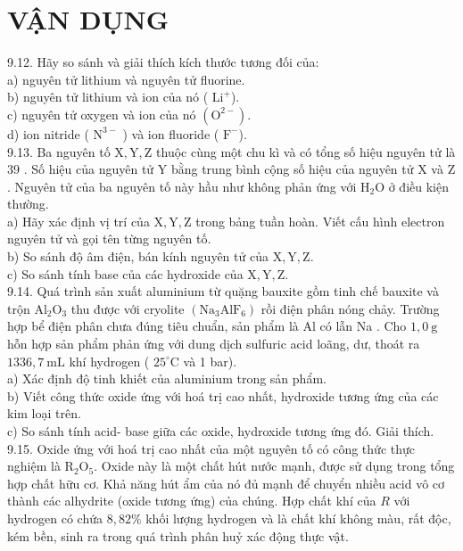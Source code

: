 \documentclass[10pt]{article}
\begin{document}
\section*{VẬN DỤNG}
9.12. Hãy so sánh và giải thích kích thước tương đối của:\\
a) nguyên tử lithium và nguyên tử fluorine.\\
b) nguyên tử lithium và ion của nó ( $\mathrm{Li}^{+}$).\\
c) nguyên tử oxygen và ion của nó $\left(\mathrm{O}^{2-}\right)$.\\
d) ion nitride ( $\mathrm{N}^{3-}$ ) và ion fluoride ( $\mathrm{F}^{-}$).\\
9.13. Ba nguyên tố $\mathrm{X}, \mathrm{Y}, \mathrm{Z}$ thuộc cùng một chu kì và có tổng số hiệu nguyên tử là 39 . Số hiệu của nguyên tử Y bằng trung bình cộng số hiệu của nguyên tử X và Z . Nguyên tử của ba nguyên tố này hầu như không phản ứng với $\mathrm{H}_{2} \mathrm{O}$ ở điều kiện thường.\\
a) Hãy xác định vị trí của $\mathrm{X}, \mathrm{Y}, \mathrm{Z}$ trong bảng tuần hoàn. Viết cấu hình electron nguyên tử và gọi tên từng nguyên tố.\\
b) So sánh độ âm điện, bán kính nguyên tử của $\mathrm{X}, \mathrm{Y}, \mathrm{Z}$.\\
c) So sánh tính base của các hydroxide của $\mathrm{X}, \mathrm{Y}, \mathrm{Z}$.\\
9.14. Quá trình sản xuất aluminium từ quặng bauxite gồm tinh chế bauxite và trộn $\mathrm{Al}_{2} \mathrm{O}_{3}$ thu được với cryolite $\left(\mathrm{Na}_{3} \mathrm{AlF}_{6}\right)$ rồi điện phân nóng chảy. Trường hợp bể điện phân chưa đúng tiêu chuẩn, sản phẩm là Al có lẫn Na . Cho $1,0 \mathrm{~g}$ hỗn hợp sản phẩm phản ứng với dung dịch sulfuric acid loãng, dư, thoát ra $1336,7 \mathrm{~mL}$ khí hydrogen ( $25^{\circ} \mathrm{C}$ và 1 bar).\\
a) Xác định độ tinh khiết của aluminium trong sản phẩm.\\
b) Viết công thức oxide ứng với hoá trị cao nhất, hydroxide tương ứng của các kim loại trên.\\
c) So sánh tính acid- base giữa các oxide, hydroxide tương ứng đó. Giải thích.\\
9.15. Oxide ứng với hoá trị cao nhất của một nguyên tố có công thức thực nghiệm là $\mathrm{R}_{2} \mathrm{O}_{5}$. Oxide này là một chất hút nước mạnh, được sử dụng trong tổng hợp chất hữu cơ. Khả năng hút ẩm của nó đủ mạnh để chuyển nhiều acid vô cơ thành các alhydrite (oxide tương ứng) của chúng. Hợp chất khí của $R$ với hydrogen có chứa $8,82 \%$ khối lượng hydrogen và là chất khí không màu, rất độc, kém bền, sinh ra trong quá trình phân huỷ xác động thực vật.\\
\end{document}
